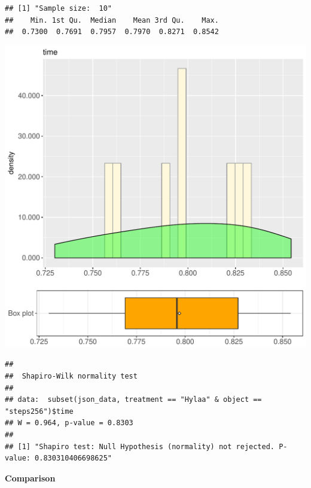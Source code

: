 \documentclass{article}\usepackage[]{graphicx}\usepackage[]{color}
\makeatletter
\def\maxwidth{ %
  \ifdim\Gin@nat@width>\linewidth
    \linewidth
  \else
    \Gin@nat@width
  \fi
}
\newenvironment{kframe}{%
 \def\at@end@of@kframe{}%
 \ifinner\ifhmode%
  \def\at@end@of@kframe{\end{minipage}}%
  \begin{minipage}{\columnwidth}%
 \fi\fi%
 \def\FrameCommand##1{\hskip\@totalleftmargin \hskip-\fboxsep
 \colorbox{shadecolor}{##1}\hskip-\fboxsep
     \hskip-\linewidth \hskip-\@totalleftmargin \hskip\columnwidth}%
 \MakeFramed {\advance\hsize-\width
   \@totalleftmargin\z@ \linewidth\hsize
   \@setminipage}}%
 {\par\unskip\endMakeFramed%
 \at@end@of@kframe}
\newenvironment{knitrout}{}{} %
\makeatother
\begin{document}
\begin{knitrout}
\color{fgcolor}\begin{kframe}
\begin{verbatim}
## [1] "Sample size:  10"
##    Min. 1st Qu.  Median    Mean 3rd Qu.    Max. 
##  0.7300  0.7691  0.7957  0.7970  0.8271  0.8542
\end{verbatim}
\end{kframe}
\includegraphics[width=\maxwidth]{figure/RH3_Hylaa_steps256-1} 
\begin{kframe}\begin{verbatim}
## 
## 	Shapiro-Wilk normality test
## 
## data:  subset(json_data, treatment == "Hylaa" & object == "steps256")$time
## W = 0.964, p-value = 0.8303
## 
## [1] "Shapiro test: Null Hypothesis (normality) not rejected. P-value: 0.830310406698625"
\end{verbatim}
\end{kframe}
\end{knitrout}
  
 \textbf{Comparison}
  
\end{document}
